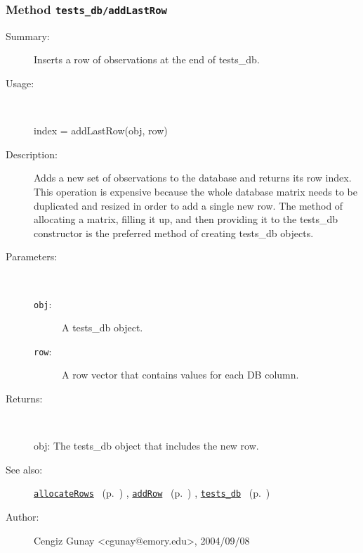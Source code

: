 \subsubsection[Method \texttt{addLastRow}]{Method \texttt{tests\_db/addLastRow}}%
%
\label{ref_tests_db__addLastRow}%
\hypertarget{ref_tests_db__addLastRow}{}%
\begin{description}
\item[Summary:]Inserts a row of observations at the end of tests\_db.
%
\item[Usage:]~%
\begin{lyxcode}%
index = addLastRow(obj, row)
%
\end{lyxcode}%
%
\item[Description:]%
Adds a new set of observations to the database and returns its row index.
   This operation is expensive because the whole 
   database matrix needs to be duplicated and resized in order to add a 
   single new row. The method of allocating a matrix, filling it up, and
   then providing it to the tests\_db constructor is the preferred method 
   of creating tests\_db objects.
\item[Parameters:]~
\begin{description}%
\item[\texttt{obj}:]
 A tests\_db object.
\item[\texttt{row}:]
 A row vector that contains values for each DB column.
\end{description}%
%
\item[Returns:
]~

	obj: The tests\_db object that includes the new row.
%
%
\item[See also:]%
\hyperlink{ref_allocateRows}{\texttt{allocateRows}}%
\ (p.~\pageref{ref_allocateRows})%
%
, \hyperlink{ref_addRow}{\texttt{addRow}}%
\ (p.~\pageref{ref_addRow})%
%
, \hyperlink{ref_tests_db}{\texttt{tests\_db}}%
\ (p.~\pageref{ref_tests_db})%
%
%
\item[Author:]%
Cengiz Gunay <cgunay@emory.edu>, 2004/09/08
%
\end{description}
\methodline%
